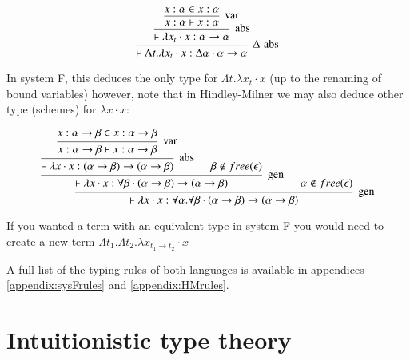             \[\begin{array}{c}
            \mbox{\begin{prooftree}
                  \hypo{x : \alpha \in x : \alpha}
                \infer1[var]{x : \alpha \vdash x : \alpha}
               \infer1[abs]{\vdash \lambda x_t \cdot x : \alpha \to \alpha}
               \infer1[$\Delta$-abs]{\vdash \Lambda t . \lambda x_t \cdot
                 x : \Delta \alpha \cdot \alpha \to \alpha}
            \end{prooftree}}
            \end{array} \]
            
            In system F, this deduces the only type for $\Lambda t . \lambda x_t
            \cdot x$ (up to the renaming of bound variables) however, note that
            in Hindley-Milner we may also deduce other type (schemes)
            for $\lambda x \cdot x$: 
            
            \[\begin{array}{c}
            \mbox{\begin{prooftree}
                        \hypo{x : \alpha \to \beta \in x : \alpha \to \beta}
                    \infer1[var]{x : \alpha \to \beta \vdash x : \alpha \to \beta}   
                    \infer1[abs]{\vdash \lambda x \cdot x : (\alpha \to \beta) \to
                    (\alpha \to \beta)}
                    \hypo{\beta \notin free(\epsilon)}        
                \infer2[gen]{\vdash \lambda x \cdot x : \forall \beta \cdot
                  (\alpha \to \beta) \to (\alpha \to \beta)}
                \hypo{\alpha \notin free(\epsilon)}
               \infer2[gen]{\vdash \lambda x \cdot x : \forall \alpha . \forall
                 \beta \cdot (\alpha \to \beta) \to (\alpha \to \beta)}
            \end{prooftree}}
            \end{array} \]
                                   
            If you wanted a term with an equivalent type in system F you would
            need to create a new term $\Lambda t_1 . \Lambda t_2 . \lambda x_{t_1
              \to t_2} \cdot x$
            
            A full list of the typing rules of both languages is available in
            appendices \ref{appendix:sysFrules} and
            \ref{appendix:HMrules}. 
                    
          \section{Intuitionistic type theory}
        
